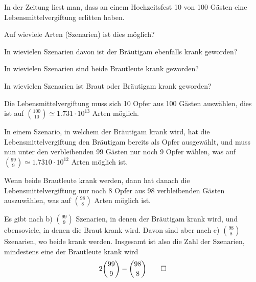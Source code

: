 In der Zeitung liest man, dass an einem Hochzeitsfest 10
von 100 Gästen eine Lebensmittelvergiftung erlitten haben.
\begin{teilaufgaben}
\item
Auf wieviele Arten (Szenarien) ist dies möglich?
\item
In wievielen Szenarien
davon ist der Bräutigam ebenfalls krank geworden?
\item In wievielen Szenarien sind beide Brautleute krank
geworden?
\item In wievielen Szenarien ist Braut oder Bräutigam
krank geworden?
\end{teilaufgaben}

\begin{loesung}
\begin{teilaufgaben}
\item Die Lebensmittelvergiftung muss sich 10 Opfer aus 100 Gästen
auswählen, dies ist auf $ \binom{100}{10}\simeq 1.731\cdot10^{13}$
Arten möglich.
\item
In einem Szenario, in welchem der Bräutigam krank wird, hat die
Lebensmittelvergiftung den Bräutigam bereits als Opfer ausgewählt,
und muss nun unter den verbleibenden 99 Gästen nur noch 9 Opfer
wählen, was auf $\binom{99}{9}\simeq1.7310\cdot10^{12}$ Arten
möglich ist.
\item
Wenn beide Brautleute krank werden, dann hat danach die Lebensmittelvergiftung
nur noch 8 Opfer aus 98 verbleibenden Gästen auszuwählen, was auf
$\binom{98}{8}$ Arten möglich ist.
\item
Es gibt nach b) $\binom{99}{9}$ Szenarien, in denen der Bräutigam
krank wird, und ebensoviele, in denen die Braut krank wird. Davon
sind aber nach c) $\binom{98}{8}$ Szenarien, wo beide krank werden.
Insgesamt ist also die Zahl der Szenarien, mindestens eine der Brautleute
krank wird
\[
2\binom{99}{9}-\binom{98}{8}
\qedhere
\]
\end{teilaufgaben}
\end{loesung}

